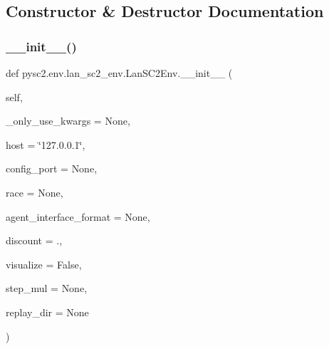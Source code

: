 \subsection{Constructor \& Destructor Documentation}
\mbox{\label{classpysc2_1_1env_1_1lan__sc2__env_1_1_lan_s_c2_env_af811660c93bbe7d4660fcdc7317bb57f}} 
\subsubsection{\texorpdfstring{\+\_\+\+\_\+init\+\_\+\+\_\+()}{\_\_init\_\_()}}
{\footnotesize\ttfamily def pysc2.\+env.\+lan\+\_\+sc2\+\_\+env.\+Lan\+S\+C2\+Env.\+\_\+\+\_\+init\+\_\+\+\_\+ (\begin{DoxyParamCaption}\item[{}]{self,  }\item[{}]{\+\_\+only\+\_\+use\+\_\+kwargs = {\ttfamily None},  }\item[{}]{host = {\ttfamily \char`\"{}127.0.0.1\char`\"{}},  }\item[{}]{config\+\_\+port = {\ttfamily None},  }\item[{}]{race = {\ttfamily None},  }\item[{}]{agent\+\_\+interface\+\_\+format = {\ttfamily None},  }\item[{}]{discount = {.},  }\item[{}]{visualize = {\ttfamily False},  }\item[{}]{step\+\_\+mul = {\ttfamily None},  }\item[{}]{replay\+\_\+dir = {\ttfamily None} }\end{DoxyParamCaption})}

